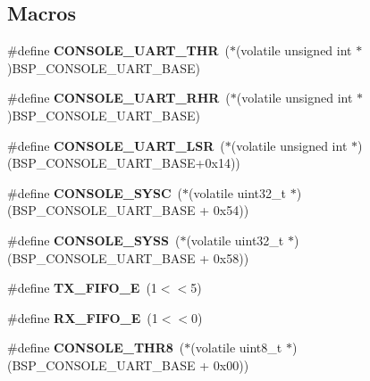\subsection*{Macros}
\begin{DoxyCompactItemize}
\item 
\mbox{\label{arm_2beagle_2console_2console-config_8c_a59b5144457a70efc490f603d64f8d78f}} 
\#define {\bfseries C\+O\+N\+S\+O\+L\+E\+\_\+\+U\+A\+R\+T\+\_\+\+T\+HR}~($\ast$(volatile unsigned int $\ast$)B\+S\+P\+\_\+\+C\+O\+N\+S\+O\+L\+E\+\_\+\+U\+A\+R\+T\+\_\+\+B\+A\+SE)
\item 
\mbox{\label{arm_2beagle_2console_2console-config_8c_ab28a49019a4763bda42adc16b2c2a86b}} 
\#define {\bfseries C\+O\+N\+S\+O\+L\+E\+\_\+\+U\+A\+R\+T\+\_\+\+R\+HR}~($\ast$(volatile unsigned int $\ast$)B\+S\+P\+\_\+\+C\+O\+N\+S\+O\+L\+E\+\_\+\+U\+A\+R\+T\+\_\+\+B\+A\+SE)
\item 
\mbox{\label{arm_2beagle_2console_2console-config_8c_af6259f175c48e42a086f8b5cf322cce3}} 
\#define {\bfseries C\+O\+N\+S\+O\+L\+E\+\_\+\+U\+A\+R\+T\+\_\+\+L\+SR}~($\ast$(volatile unsigned int $\ast$)(B\+S\+P\+\_\+\+C\+O\+N\+S\+O\+L\+E\+\_\+\+U\+A\+R\+T\+\_\+\+B\+A\+SE+0x14))
\item 
\mbox{\label{arm_2beagle_2console_2console-config_8c_a55fd28bbf1b696533665d306605ff1f0}} 
\#define {\bfseries C\+O\+N\+S\+O\+L\+E\+\_\+\+S\+Y\+SC}~($\ast$(volatile uint32\+\_\+t $\ast$) (B\+S\+P\+\_\+\+C\+O\+N\+S\+O\+L\+E\+\_\+\+U\+A\+R\+T\+\_\+\+B\+A\+SE + 0x54))
\item 
\mbox{\label{arm_2beagle_2console_2console-config_8c_a9cdea9d916e65071e7ea12bb227a03da}} 
\#define {\bfseries C\+O\+N\+S\+O\+L\+E\+\_\+\+S\+Y\+SS}~($\ast$(volatile uint32\+\_\+t $\ast$) (B\+S\+P\+\_\+\+C\+O\+N\+S\+O\+L\+E\+\_\+\+U\+A\+R\+T\+\_\+\+B\+A\+SE + 0x58))
\item 
\mbox{\label{arm_2beagle_2console_2console-config_8c_aeac3120aa961715b258f782d4ca2fae1}} 
\#define {\bfseries T\+X\+\_\+\+F\+I\+F\+O\+\_\+E}~(1$<$$<$5)
\item 
\mbox{\label{arm_2beagle_2console_2console-config_8c_a3fff9c7b0d8c1a5c0b64937e08cba175}} 
\#define {\bfseries R\+X\+\_\+\+F\+I\+F\+O\+\_\+E}~(1$<$$<$0)
\item 
\mbox{\label{arm_2beagle_2console_2console-config_8c_ab917fea2c7ffeecec47523da366ecf62}} 
\#define {\bfseries C\+O\+N\+S\+O\+L\+E\+\_\+\+T\+H\+R8}~($\ast$(volatile uint8\+\_\+t $\ast$) (B\+S\+P\+\_\+\+C\+O\+N\+S\+O\+L\+E\+\_\+\+U\+A\+R\+T\+\_\+\+B\+A\+SE + 0x00))
\end{DoxyCompactItemize}
